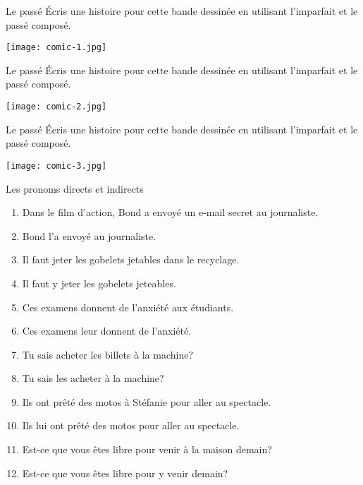 \documentclass{beamer}
\begin{document}
  \begin{frame}[t]{Le passé}
    Écris une histoire pour cette bande dessinée en utilisant \alert{l'imparfait} et \alert{le passé composé}.
    \begin{center}
      \texttt{[image: comic-1.jpg]}
    \end{center}
  \end{frame}

  \begin{frame}[t]{Le passé}
    Écris une histoire pour cette bande dessinée en utilisant \alert{l'imparfait} et \alert{le passé composé}.
    \begin{center}
      \texttt{[image: comic-2.jpg]}
    \end{center}
  \end{frame}

  \begin{frame}[t]{Le passé}
    Écris une histoire pour cette bande dessinée en utilisant \alert{l'imparfait} et \alert{le passé composé}.
    \begin{center}
      \texttt{[image: comic-3.jpg]}
    \end{center}
  \end{frame}

  \begin{frame}{Les pronoms directs et indirects}
    \begin{enumerate}
      \item Dans le film d'action, Bond a envoyé \alert{un e-mail secret} au journaliste.
      \item<2->[$\to$] Bond l'a envoyé au journaliste.
      \item Il faut jeter les gobelets jetables \alert{dans le recyclage}.
      \item<3->[$\to$] Il faut y jeter les gobelets jeteables.
      \item Ces examens donnent de l'anxiété \alert{aux étudiants}.
      \item<4->[$\to$] Ces examens leur donnent de l'anxiété.
      \item Tu sais acheter \alert{les billets} à la machine?
      \item<5->[$\to$] Tu sais les acheter à la machine?
      \item Ils ont prêté des motos \alert{à Stéfanie} pour aller au spectacle.
      \item<6->[$\to$] Ils lui ont prêté des motos pour aller au spectacle.
      \item Est-ce que vous êtes libre pour venir \alert{à la maison} demain?
      \item<7->[$\to$] Est-ce que vous êtes libre pour y venir demain?
    \end{enumerate}
  \end{frame}
\end{document}
